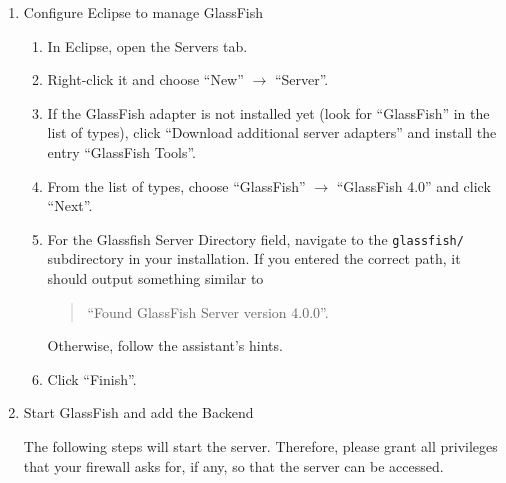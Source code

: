 \begin{enumerate}

\item Configure Eclipse to manage GlassFish

\begin{enumerate}
\item In Eclipse, open the Servers tab.
\item Right-click it and choose \enquote{New} $\rightarrow$ \enquote{Server}.
\item If the GlassFish adapter is not installed yet (look for \enquote{GlassFish} in the list of types), click \enquote{Download additional server adapters} and install the entry \enquote{GlassFish Tools}.
\item From the list of types, choose \enquote{GlassFish} $\rightarrow$ \enquote{GlassFish 4.0} and click \enquote{Next}.
\item For the Glassfish Server Directory field, navigate to the \lstinline[language=Simple]|glassfish/| subdirectory in your installation. If you entered the correct path, it should output something similar to
	\begin{quotation}
	\enquote{Found GlassFish Server version 4.0.0}.
	\end{quotation}
	Otherwise, follow the assistant's hints.
\item Click \enquote{Finish}.

\end{enumerate}



\item Start GlassFish and add the Backend

	The following steps will start the server.
	Therefore, please grant all privileges that your firewall asks for, if any, so that the server can be accessed.


\end{enumerate}
